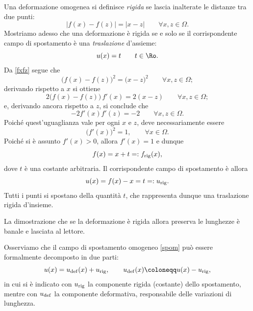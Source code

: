 Una deformazione omogenea si definisce \textit{rigida} se lascia inalterate le distanze tra due punti:
\begin{equation}\label{fxfz}
|f(x)-f(z)|=|x-z| \qquad \forall x,z\in\Omega.
\end{equation}
Mostriamo adesso che una deformazione è rigida se e solo se il corrispondente campo di spostamento è  una \textit{traslazione} d'assieme:
\begin{equation}
u(x)=t \qquad t\in\Ro.
\end{equation}
Da \eqref{fxfz} segue che
\begin{equation}
\big(f(x)-f(z)\big)^2=\big(x-z\big)^2 \qquad \forall x,z\in\Omega;
\end{equation}
derivando rispetto a $x$ si ottiene 
\begin{equation}
2\big(f(x)-f(z)  \big)\,f'(x)=2(x-z) \qquad \forall x,z\in\Omega;
\end{equation}
e, derivando ancora rispetto a $z$, si conclude che
\begin{equation}
-2f'(x)f'(z)=-2 \qquad \forall x,z\in\Omega.
\end{equation}
Poiché quest'uguaglianza vale per ogni $x$ e $z$, deve necessariamente essere
\begin{equation}
\big( f'(x) \big)^2=1, \qquad \forall  x\in\Omega.
\end{equation}
Poiché si è assunto $f'(x)>0$, allora $f'(x)=1$ e dunque
\begin{equation}
	f(x)=x+t=:f_{\rm rig}(x), 
\end{equation}
dove $t$ è una costante arbitraria. Il corrispondente campo di spostamento è allora
\begin{equation}
u(x)=f(x)-x=t=:u_{\rm rig}.
\end{equation}
Tutti i punti si spostano della quantità $t$, che rappresenta dunque una traslazione rigida d'insieme.

La dimostrazione che se la deformazione è rigida allora preserva le lunghezze è banale e lasciata al lettore.

Osserviamo  che il campo di spostamento omogeneo \eqref{spom} può essere formalmente decomposto in due parti:
\begin{equation}
u(x)=u_{\rm def}(x)+u_{\rm rig}, \qquad  u_{\rm def}(x)\coloneqq u(x)-u_{\rm rig},
\end{equation}
in cui si è indicato con $u_{\rm rig}$ la componente rigida (costante) dello spostamento, mentre con $u_{\rm def}$ la componente deformativa, responsabile delle variazioni di lunghezza.

